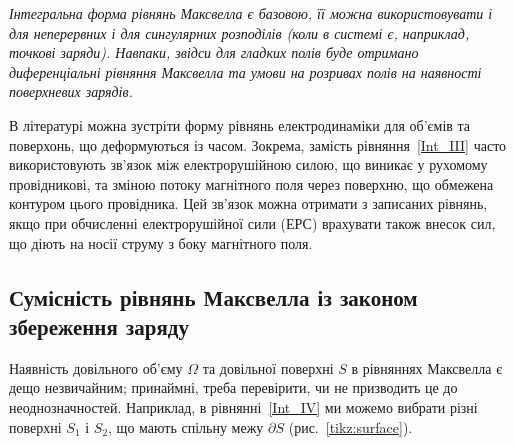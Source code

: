 \emph{Інтегральна форма рівнянь Максвелла є базовою, її можна використовувати і для неперервних і для сингулярних розподілів (коли в системі є, наприклад, точкові заряди). Навпаки, звідси для гладких полів  буде отримано диференціальні рівняння Максвелла та умови на розривах полів на наявності поверхневих зарядів.}

В літературі можна зустріти форму рівнянь електродинаміки для об'ємів та поверхонь, що деформуються із часом. Зокрема, замість рівняння~\eqref{Int_III} часто використовують зв'язок між електрорушійною силою, що виникає у рухомому провідникові, та зміною потоку магнітного поля через поверхню, що обмежена контуром цього провідника. Цей зв'язок можна отримати з записаних рівнянь, якщо при обчисленні електрорушійної сили (ЕРС) врахувати також внесок сил, що діють на носії струму з боку магнітного поля.


\subsection*{Сумісність рівнянь Максвелла із законом збереження заряду}


Наявність довільного об'єму $\Omega$ та довільної поверхні $S$ в рівняннях Максвелла є дещо незвичайним; принаймні,
треба перевірити, чи не призводить це до неоднозначностей. Наприклад, в рівнянні~\eqref{Int_IV} ми можемо вибрати різні
поверхні $S_1$ і $S_2$, що мають спільну межу $\partial S$ (рис.~\ref{tikz:surface}).

